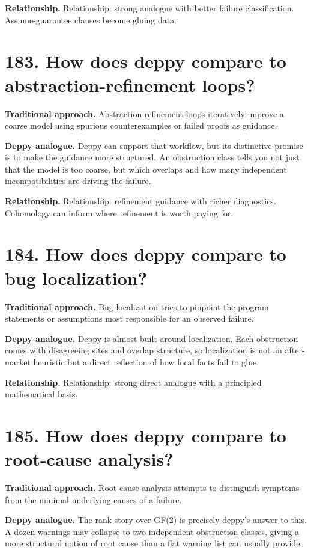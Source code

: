 \documentclass[11pt,openany]{book}
\begin{document}
\textbf{Relationship.} Relationship: strong analogue with better failure classification. Assume-guarantee clauses become gluing data.

\section*{183. How does deppy compare to abstraction-refinement loops?}
\textbf{Traditional approach.} Abstraction-refinement loops iteratively improve a coarse model using spurious counterexamples or failed proofs as guidance.

\textbf{Deppy analogue.} Deppy can support that workflow, but its distinctive promise is to make the guidance more structured. An obstruction class tells you not just that the model is too coarse, but which overlaps and how many independent incompatibilities are driving the failure.

\textbf{Relationship.} Relationship: refinement guidance with richer diagnostics. Cohomology can inform where refinement is worth paying for.

\section*{184. How does deppy compare to bug localization?}
\textbf{Traditional approach.} Bug localization tries to pinpoint the program statements or assumptions most responsible for an observed failure.

\textbf{Deppy analogue.} Deppy is almost built around localization. Each obstruction comes with disagreeing sites and overlap structure, so localization is not an after-market heuristic but a direct reflection of how local facts fail to glue.

\textbf{Relationship.} Relationship: strong direct analogue with a principled mathematical basis.

\section*{185. How does deppy compare to root-cause analysis?}
\textbf{Traditional approach.} Root-cause analysis attempts to distinguish symptoms from the minimal underlying causes of a failure.

\textbf{Deppy analogue.} The rank story over GF(2) is precisely deppy's answer to this. A dozen warnings may collapse to two independent obstruction classes, giving a more structural notion of root cause than a flat warning list can usually provide.
\end{document}
